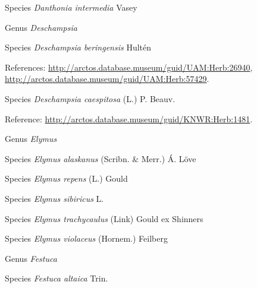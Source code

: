 \documentclass[9pt, article]{memoir}
\begin{document}
\begin{multicols}{2}
\vspace{6pt}\noindent\hspace{36pt}Species \textit{Danthonia intermedia} Vasey


\vspace{6pt}\noindent\hspace{30pt}Genus \textit{Deschampsia}


\vspace{6pt}\noindent\hspace{36pt}Species \textit{Deschampsia beringensis} Hultén


\vspace{6pt}References: 
\url{http://arctos.database.museum/guid/UAM:Herb:26940}, 
\url{http://arctos.database.museum/guid/UAM:Herb:57429}.

\vspace{6pt}\noindent\hspace{36pt}Species \textit{Deschampsia caespitosa} (L.) P. Beauv.


\vspace{6pt}Reference: 
\url{http://arctos.database.museum/guid/KNWR:Herb:1481}.

\vspace{6pt}\noindent\hspace{30pt}Genus \textit{Elymus}


\vspace{6pt}\noindent\hspace{36pt}Species \textit{Elymus alaskanus} (Scribn. \& Merr.) Á. Löve


\vspace{6pt}\noindent\hspace{36pt}Species \textit{Elymus repens} (L.) Gould


\vspace{6pt}\noindent\hspace{36pt}Species \textit{Elymus sibiricus} L.


\vspace{6pt}\noindent\hspace{36pt}Species \textit{Elymus trachycaulus} (Link) Gould ex Shinners


\vspace{6pt}\noindent\hspace{36pt}Species \textit{Elymus violaceus} (Hornem.) Feilberg


\vspace{6pt}\noindent\hspace{30pt}Genus \textit{Festuca}


\vspace{6pt}\noindent\hspace{36pt}Species \textit{Festuca altaica} Trin.



\end{multicols}
\end{document}
